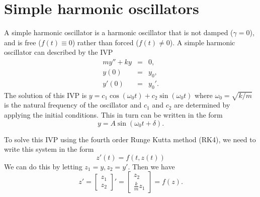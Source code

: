 
\section*{Simple harmonic oscillators}
A simple harmonic oscillator is a harmonic oscillator that is not damped ($\gamma =0$), and is free ($f(t) \equiv 0$) rather than forced ($f(t) \not = 0$). A simple harmonic oscillator can described by the IVP
\begin{eqnarray*}
my'' + ky &=& 0,\\
y(0) &=& y_0,\\
y'(0) &=& y_0'.
\end{eqnarray*} 
The solution of this IVP is $y = c_1\cos (\omega_0 t) + c_2 \sin (\omega_0 t)$ where $\omega_0 = \sqrt{k/m}$ is the natural frequency of the oscillator and $c_1$ and $c_2$ are determined by applying the initial conditions. This in turn can be written in the form 
\[y = A\sin (\omega_0 t + \delta) .\]

To solve this IVP using the fourth order Runge Kutta method (RK4), we need to write this system in the form 
\[z'(t) = f(t,z(t)) \]
We can do this by letting $z_1 = y, z_2 = y'$. Then we have 
\[     z'=  \left[\begin{array}{c}z_1 \\z_2\end{array}\right]'  =  \left[\begin{array}{c}z_2 \\\frac{k}{m}z_1\end{array}\right]= f(z).\]


